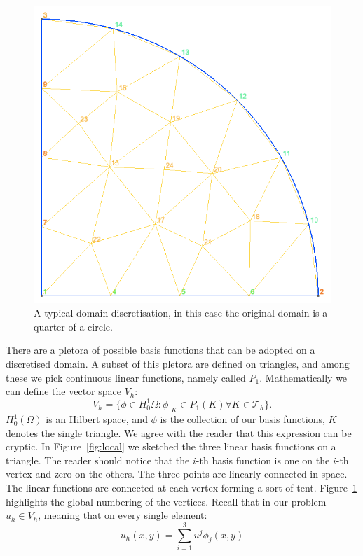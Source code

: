 \documentclass[11pt]{amsart}
\begin{document}
\begin{figure}[h]
\centering
\includegraphics[scale=.3]{mesh.png}
\caption{A typical domain discretisation, in this case the original 
domain is a quarter of a circle.}
\label{fig:mesh}
\end{figure}

There are a pletora of possible basis functions that can be adopted on a discretised
domain. A subset of this pletora are defined on triangles, and among these we pick 
continuous linear functions, namely called $P_1$. Mathematically we can define the 
vector space $V_h$:
\[
V_h = \{\phi \in H^1_0{\Omega} : \phi|_K \in P_1(K) \forall K\in \mathcal{T}_h\}.
\]
$H^1_0(\Omega)$ is an Hilbert space, and $\phi$ is the collection of our basis 
functions, $K$ denotes the single triangle. We agree with the reader that this 
expression can be cryptic. In Figure~\ref{fig:local} we 
sketched the three linear basis functions on a triangle. The reader should notice 
that the $i$-th basis function is one on the $i$-th vertex and zero on the others. 
The three points are linearly connected in space. The linear functions are connected at 
each vertex forming a sort of tent. Figure~\ref{fig:mesh} highlights the global 
numbering of the vertices. Recall that in our problem $u_h\in V_h$, meaning that on 
every single element:
\[
u_h(x,y) = \sum_{i = 1}^3 u^j \phi_j(x,y) 
\]
\end{document}
